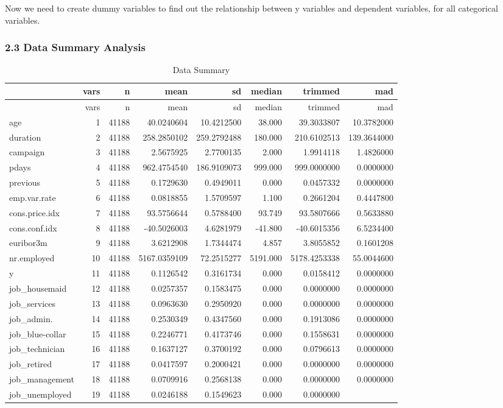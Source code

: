 \documentclass[english,man]{apa6}
\begin{document}
Now we need to create dummy variables to find out the relationship
between y variables and dependent variables, for all categorical
variables.\\

\subsubsection{2.3 Data Summary Analysis}\label{data-summary-analysis}

\begin{longtable}[c]{@{}lrrrrrrr@{}}
\caption{Data Summary}\tabularnewline
\toprule
& vars & n & mean & sd & median & trimmed & mad\tabularnewline
\midrule
\endfirsthead
\toprule
& vars & n & mean & sd & median & trimmed & mad\tabularnewline
\midrule
\endhead
age & 1 & 41188 & 40.0240604 & 10.4212500 & 38.000 & 39.3033807 &
10.3782000\tabularnewline
duration & 2 & 41188 & 258.2850102 & 259.2792488 & 180.000 & 210.6102513
& 139.3644000\tabularnewline
campaign & 3 & 41188 & 2.5675925 & 2.7700135 & 2.000 & 1.9914118 &
1.4826000\tabularnewline
pdays & 4 & 41188 & 962.4754540 & 186.9109073 & 999.000 & 999.0000000 &
0.0000000\tabularnewline
previous & 5 & 41188 & 0.1729630 & 0.4949011 & 0.000 & 0.0457332 &
0.0000000\tabularnewline
emp.var.rate & 6 & 41188 & 0.0818855 & 1.5709597 & 1.100 & 0.2661204 &
0.4447800\tabularnewline
cons.price.idx & 7 & 41188 & 93.5756644 & 0.5788400 & 93.749 &
93.5807666 & 0.5633880\tabularnewline
cons.conf.idx & 8 & 41188 & -40.5026003 & 4.6281979 & -41.800 &
-40.6015356 & 6.5234400\tabularnewline
euribor3m & 9 & 41188 & 3.6212908 & 1.7344474 & 4.857 & 3.8055852 &
0.1601208\tabularnewline
nr.employed & 10 & 41188 & 5167.0359109 & 72.2515277 & 5191.000 &
5178.4253338 & 55.0044600\tabularnewline
y & 11 & 41188 & 0.1126542 & 0.3161734 & 0.000 & 0.0158412 &
0.0000000\tabularnewline
job\_housemaid & 12 & 41188 & 0.0257357 & 0.1583475 & 0.000 & 0.0000000
& 0.0000000\tabularnewline
job\_services & 13 & 41188 & 0.0963630 & 0.2950920 & 0.000 & 0.0000000 &
0.0000000\tabularnewline
job\_admin. & 14 & 41188 & 0.2530349 & 0.4347560 & 0.000 & 0.1913086 &
0.0000000\tabularnewline
job\_blue-collar & 15 & 41188 & 0.2246771 & 0.4173746 & 0.000 &
0.1558631 & 0.0000000\tabularnewline
job\_technician & 16 & 41188 & 0.1637127 & 0.3700192 & 0.000 & 0.0796613
& 0.0000000\tabularnewline
job\_retired & 17 & 41188 & 0.0417597 & 0.2000421 & 0.000 & 0.0000000 &
0.0000000\tabularnewline
job\_management & 18 & 41188 & 0.0709916 & 0.2568138 & 0.000 & 0.0000000
& 0.0000000\tabularnewline
job\_unemployed & 19 & 41188 & 0.0246188 & 0.1549623 & 0.000 & 0.0000000

\end{longtable}
\end{document}
